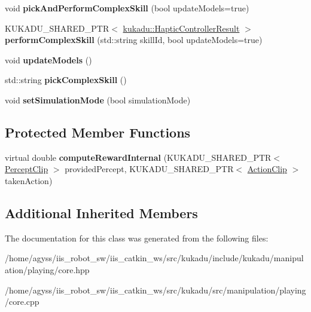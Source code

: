 \begin{DoxyCompactItemize}
\item 
void {\bfseries pick\+And\+Perform\+Complex\+Skill} (bool update\+Models=true)\hypertarget{classkukadu_1_1HapticPlanner_a267e6afa41919c58b1a37bd0e460dfb9}{}\label{classkukadu_1_1HapticPlanner_a267e6afa41919c58b1a37bd0e460dfb9}

\item 
K\+U\+K\+A\+D\+U\+\_\+\+S\+H\+A\+R\+E\+D\+\_\+\+P\+TR$<$ \hyperlink{classkukadu_1_1HapticControllerResult}{kukadu\+::\+Haptic\+Controller\+Result} $>$ {\bfseries perform\+Complex\+Skill} (std\+::string skill\+Id, bool update\+Models=true)\hypertarget{classkukadu_1_1HapticPlanner_ac8eb5e6c2b41dc7766c1503b50541302}{}\label{classkukadu_1_1HapticPlanner_ac8eb5e6c2b41dc7766c1503b50541302}

\item 
void {\bfseries update\+Models} ()\hypertarget{classkukadu_1_1HapticPlanner_a2ed1772fee9f9b2dc4930b66896cb5ff}{}\label{classkukadu_1_1HapticPlanner_a2ed1772fee9f9b2dc4930b66896cb5ff}

\item 
std\+::string {\bfseries pick\+Complex\+Skill} ()\hypertarget{classkukadu_1_1HapticPlanner_a87764109bd04a93c93f91a37de9dd214}{}\label{classkukadu_1_1HapticPlanner_a87764109bd04a93c93f91a37de9dd214}

\item 
void {\bfseries set\+Simulation\+Mode} (bool simulation\+Mode)\hypertarget{classkukadu_1_1HapticPlanner_afc97d78845cd9675993f352845c5c02e}{}\label{classkukadu_1_1HapticPlanner_afc97d78845cd9675993f352845c5c02e}

\end{DoxyCompactItemize}
\subsection*{Protected Member Functions}
\begin{DoxyCompactItemize}
\item 
virtual double {\bfseries compute\+Reward\+Internal} (K\+U\+K\+A\+D\+U\+\_\+\+S\+H\+A\+R\+E\+D\+\_\+\+P\+TR$<$ \hyperlink{classkukadu_1_1PerceptClip}{Percept\+Clip} $>$ provided\+Percept, K\+U\+K\+A\+D\+U\+\_\+\+S\+H\+A\+R\+E\+D\+\_\+\+P\+TR$<$ \hyperlink{classkukadu_1_1ActionClip}{Action\+Clip} $>$ taken\+Action)\hypertarget{classkukadu_1_1HapticPlanner_a8d73a2aa0ca782970a1885a7b8970e5f}{}\label{classkukadu_1_1HapticPlanner_a8d73a2aa0ca782970a1885a7b8970e5f}

\end{DoxyCompactItemize}
\subsection*{Additional Inherited Members}


The documentation for this class was generated from the following files\+:\begin{DoxyCompactItemize}
\item 
/home/agyss/iis\+\_\+robot\+\_\+sw/iis\+\_\+catkin\+\_\+ws/src/kukadu/include/kukadu/manipulation/playing/core.\+hpp\item 
/home/agyss/iis\+\_\+robot\+\_\+sw/iis\+\_\+catkin\+\_\+ws/src/kukadu/src/manipulation/playing/core.\+cpp\end{DoxyCompactItemize}
